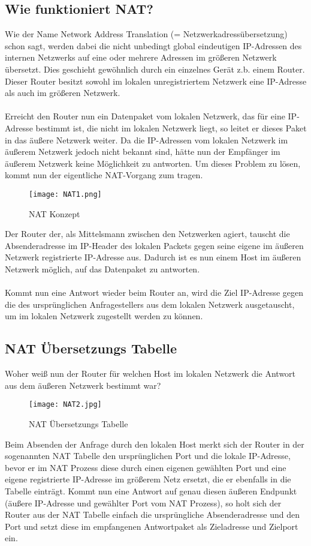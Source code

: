 \subsection{Wie funktioniert NAT?}
Wie der Name Network Address Translation (= Netzwerkadressübersetzung) schon sagt, werden dabei die nicht unbedingt global eindeutigen IP-Adressen des internen Netzwerks auf eine oder mehrere Adressen im größeren Netzwerk übersetzt. Dies geschieht gewöhnlich durch ein einzelnes Gerät z.b. einem Router. Dieser Router besitzt sowohl im lokalen unregistriertem Netzwerk eine IP-Adresse als auch im größeren Netzwerk.
\\\\
Erreicht den Router nun ein Datenpaket vom lokalen Netzwerk, das für eine IP-Adresse bestimmt ist, die nicht im lokalen Netzwerk liegt, so leitet er dieses Paket in das äußere Netzwerk weiter. Da die IP-Adressen vom lokalen Netzwerk im äußerem Netzwerk jedoch nicht bekannt sind, hätte nun der Empfänger im äußerem Netzwerk keine Möglichkeit zu antworten. Um dieses Problem zu lösen, kommt nun der eigentliche NAT-Vorgang zum tragen. 


\newpage
\begin{figure}[h]
    \centering
    \texttt{[image: NAT1.png]}
    \caption[NAT1]{NAT Konzept}%
\end{figure}
Der Router der, als Mittelsmann zwischen den Netzwerken agiert, tauscht die Absenderadresse im IP-Header des lokalen Packets gegen seine eigene im äußeren Netzwerk registrierte IP-Adresse aus. Dadurch ist es nun einem Host im äußeren Netzwerk möglich, auf das Datenpaket zu antworten. 
\\\\
Kommt nun eine Antwort wieder beim Router an, wird die Ziel IP-Adresse gegen die des ursprünglichen Anfragestellers aus dem lokalen Netzwerk ausgetauscht, um im lokalen Netzwerk zugestellt werden zu können.
\subsection{NAT Übersetzungs Tabelle}
Woher weiß nun der Router für welchen Host im lokalen Netzwerk die Antwort aus dem äußeren Netzwerk bestimmt war? 
\begin{figure}[h]
    \centering
    \texttt{[image: NAT2.jpg]}
    \caption[NAT2]{NAT Übersetzungs Tabelle}
\end{figure}
Beim Absenden der Anfrage durch den lokalen Host merkt sich der Router in der sogenannten NAT Tabelle den ursprünglichen Port und die lokale IP-Adresse, bevor er im NAT Prozess diese durch einen eigenen gewählten Port und eine eigene registrierte IP-Adresse im größerem Netz ersetzt, die er ebenfalls in die Tabelle einträgt. 
Kommt nun eine Antwort auf genau diesen äußeren Endpunkt (äußere IP-Adresse und gewählter Port vom NAT Prozess), so holt sich der Router aus der NAT Tabelle einfach die ursprüngliche Absenderadresse und den Port und setzt diese im empfangenen Antwortpaket als Zieladresse und Zielport ein. 
